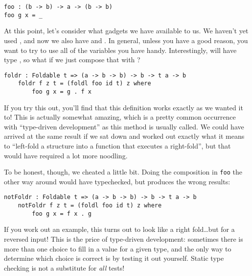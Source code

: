 \begin{lstlisting}[language=pseudoml]
foo : (b -> b) -> a -> (b -> b)
foo g x = _
\end{lstlisting}

At this point, let's consider what gadgets we have available to us. We haven't yet used , and now we also have  and . In general, unless you have a good reason, you want to try to use all of the variables you have handy. Interestingly,  will have type , so what if we just compose that with ?

\begin{lstlisting}[language=pseudoml]
    foldr : Foldable t => (a -> b -> b) -> b -> t a -> b
    foldr f z t = (foldl foo id t) z where
        foo g x = g . f x
\end{lstlisting}

If you try this out, you'll find that this definition works exactly as we wanted it to! This is actually somewhat amazing, which is a pretty common occurrence with ``type-driven development'' as this method is usually called. We could have arrived at the same result if we sat down and worked out exactly what it means to ``left-fold a structure into a function that executes a right-fold'', but that would have required a lot more noodling.

To be honest, though, we cheated a little bit. Doing the composition in \texttt{foo} the other way around would have typechecked, but produces the wrong results:

\begin{lstlisting}[language=pseudoml]
    notFoldr : Foldable t => (a -> b -> b) -> b -> t a -> b
    notFoldr f z t = (foldl foo id t) z where
        foo g x = f x . g
\end{lstlisting}

If you work out an example, this turns out to look like a right fold\ldots{}but for a reversed input! This is the price of type-driven development: sometimes there is more than one choice to fill in a value for a given type, and the only way to determine which choice is correct is by testing it out yourself. Static type checking is not a substitute for \emph{all} tests!
